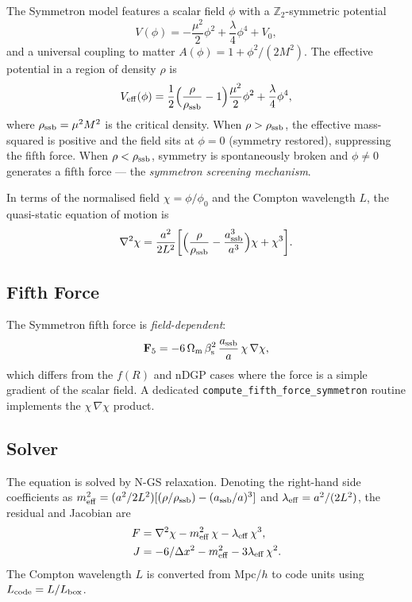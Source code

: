 \documentclass[fleqn,usenatbib]{mnras}
\newcommand{\code}[1]{\texttt{#1}}
\newcommand{\Om}{\Omega_{\rm m}}
\newcommand{\fR}{f(R)}
\begin{document}
The Symmetron model \citep{Hinterbichler2010,Hinterbichler2011}
features a scalar field $\phi$ with a $\mathbb{Z}_2$-symmetric
potential
\begin{equation}
V(\phi) = -\frac{\mu^2}{2}\phi^2 + \frac{\lambda}{4}\phi^4
  + V_0,
\end{equation}
and a universal coupling to matter
$A(\phi) = 1 + \phi^2/(2M^2)$.
The effective potential in a region of density $\rho$ is
\begin{equation}
V_{\rm eff}(\phi)
  = \frac{1}{2}\Bigl(\frac{\rho}{\rho_{\rm ssb}} - 1\Bigr)
    \frac{\mu^2}{2}\phi^2
  + \frac{\lambda}{4}\phi^4,
\end{equation}
where $\rho_{\rm ssb} = \mu^2 M^2$ is the critical density.  When
$\rho > \rho_{\rm ssb}$, the effective mass-squared is positive and the
field sits at $\phi = 0$ (symmetry restored), suppressing the fifth
force.  When $\rho < \rho_{\rm ssb}$, symmetry is spontaneously broken
and $\phi \neq 0$ generates a fifth force --- the
\emph{symmetron screening mechanism}.

In terms of the normalised field $\chi = \phi/\phi_0$ and the
Compton wavelength $L$, the quasi-static equation of motion is
\begin{equation}
\nabla^2\chi = \frac{a^2}{2L^2}
  \biggl[\Bigl(\frac{\rho}{\rho_{\rm ssb}}
    - \frac{a_{\rm ssb}^3}{a^3}\Bigr)\chi + \chi^3\biggr].
\label{eq:symmetron_eom}
\end{equation}

\subsection{Fifth Force}

The Symmetron fifth force is \emph{field-dependent}:
\begin{equation}
\mathbf{F}_5 = -6\,\Om\,\beta_{\rm s}^2\,
  \frac{a_{\rm ssb}}{a}\,\chi\,\nabla\chi,
\label{eq:symmetron_force}
\end{equation}
which differs from the $\fR$ and nDGP cases where the force is a
simple gradient of the scalar field.  A dedicated
\code{compute\_fifth\_force\_symmetron} routine implements the
$\chi\,\nabla\chi$ product.

\subsection{Solver}

The equation is solved by N-GS relaxation.  Denoting the
right-hand side coefficients as $m_{\rm eff}^2 = (a^2/2L^2)
[(\rho/\rho_{\rm ssb}) - (a_{\rm ssb}/a)^3]$ and
$\lambda_{\rm eff} = a^2/(2L^2)$, the residual and Jacobian are
\begin{align}
F &= \nabla^2\chi - m_{\rm eff}^2\,\chi
  - \lambda_{\rm eff}\,\chi^3, \\
J &= -6/\Delta x^2 - m_{\rm eff}^2 - 3\lambda_{\rm eff}\,\chi^2.
\end{align}
The Compton wavelength $L$ is converted from Mpc/$h$ to code units
using $L_{\rm code} = L / L_{\rm box}$.
\end{document}
